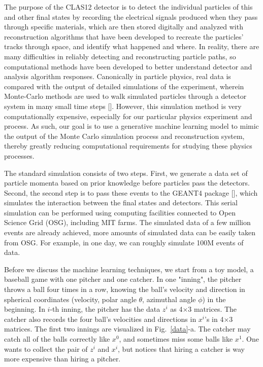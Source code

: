 \documentclass{article}
\begin{document}
\quad The purpose of the CLAS12 detector is to detect the individual particles of this and other final states by recording the electrical signals produced when they pass through specific materials, which are then stored digitally and analyzed with reconstruction algorithms that have been developed to recreate the particles' tracks through space, and identify what happened and where. In reality, there are many difficulties in reliably detecting and reconstructing particle paths, so computational methods have been developed to better understand detector and analysis algorithm responses. Canonically in particle physics, real data is compared with the output of detailed simulations of the experiment, wherein Monte-Carlo methods are used to walk simulated particles through a detector system in many small time steps [\citet{PhysRevLett.115.212003, 10.1093/ptep/ptaa104}]. However, this simulation method is very computationally expensive, especially for our particular physics experiment and process. As such, our goal is to use a generative machine learning model to mimic the output of the Monte Carlo simulation process and reconstruction system, thereby greatly reducing computational requirements for studying these physics processes. 



\quad  The standard simulation consists of two steps. First, we generate a data set of particle momenta based on prior knowledge before particles pass the detectors. Second, the second step is to pass these events to the GEANT4 package [\citet{AGOSTINELLI2003250}], which simulates the interaction between the final states and detectors. This serial simulation can be performed using computing facilities connected to Open Science Grid (OSG), including MIT farms. The simulated data of a few million events are already achieved, more amounts of simulated data can be easily taken from OSG. For example, in one day, we can roughly simulate 100M events of data.

\quad Before we discuss the machine learning techniques, we start from a toy model, a baseball game with one pitcher and one catcher. In one "inning", the pitcher throws a ball four times in a row, knowing the ball's velocity and direction in spherical coordinates (velocity, polar angle $\theta$, azimuthal angle $\phi$) in the beginning. In $i$-th inning, the pitcher has the data $z^{i}$ as 4$\times$3 matrices. The catcher also records the four ball's velocities and directions in $x^{i}$'s in 4$\times$3 matrices. The first two innings are visualized in Fig.~\ref{data}-a. The catcher may catch all of the balls correctly like $x^0$, and sometimes miss some balls like $x^1$. One wants to collect the pair of $z^i$ and $x^i$, but notices that hiring a catcher is way more expensive than hiring a pitcher.
\end{document}
